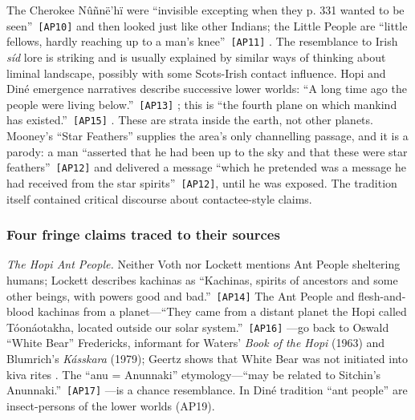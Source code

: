\documentclass[11pt,a4paper]{article}
\newcommand{\pid}[1]{\texttt{\small #1}}
\begin{document}
The Cherokee Nûñnë'hï were \enquote{invisible excepting when they p. 331 wanted to be seen}~\pid{[AP10]} and then looked just like other Indians; the Little People are \enquote{little fellows, hardly reaching up to a man's knee}~\pid{[AP11]} \parencite{mooney1900myths}. The resemblance to Irish \emph{síd} lore is striking and is usually explained by similar ways of thinking about liminal landscape, possibly with some Scots-Irish contact influence. Hopi and Diné emergence narratives describe successive lower worlds: \enquote{A long time ago the people were living below.}~\pid{[AP13]} \parencite{voth1905traditions}; this is \enquote{the fourth plane on which mankind has existed.}~\pid{[AP15]} \parencite{lockett1933unwritten}. These are strata inside the earth, not other planets. Mooney's ``Star Feathers'' supplies the area's only channelling passage, and it is a parody: a man \enquote{asserted that he had been up to the sky and that these were star feathers}~\pid{[AP12]} and delivered a message \enquote{which he pretended was a message he had received from the star spirits}~\pid{[AP12]}, until he was exposed. The tradition itself contained critical discourse about contactee-style claims.

\subsubsection{Four fringe claims traced to their sources}

\emph{The Hopi Ant People.} Neither Voth nor Lockett mentions Ant People sheltering humans; Lockett describes kachinas as \enquote{Kachinas, spirits of ancestors and some other beings, with powers good and bad.}~\pid{[AP14]} The Ant People and flesh-and-blood kachinas from a planet---\enquote{They came from a distant planet the Hopi called Tóonáotakha, located outside our solar system.}~\pid{[AP16]} \parencite{lloyd2017watchers}---go back to Oswald ``White Bear'' Fredericks, informant for Waters' \emph{Book of the Hopi} (1963) and Blumrich's \emph{Kásskara} (1979); Geertz shows that White Bear was not initiated into kiva rites \parencite{waters1963book,blumrich1979kasskara,geertz1983book,geertz1994invention}. The ``anu = Anunnaki'' etymology---\enquote{may be related to Sitchin's Anunnaki.}~\pid{[AP17]} \parencite{david2002anthills}---is a chance resemblance. In Diné tradition ``ant people'' are insect-persons of the lower worlds (AP19).
\end{document}
